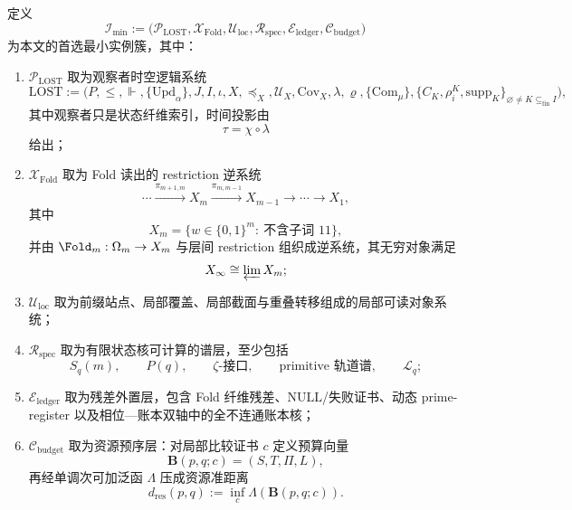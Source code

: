 \begin{definition}[首选最小实例簇]\label{def:typed-address-biaxial-completion-preferred-minimal-instantiation}
定义
\[
\mathcal I_{\min}
:=
\bigl(
\mathcal P_{\mathrm{LOST}},
\mathcal X_{\mathrm{Fold}},
\mathcal U_{\mathrm{loc}},
\mathcal R_{\mathrm{spec}},
\mathcal E_{\mathrm{ledger}},
\mathcal C_{\mathrm{budget}}
\bigr)
\]
为本文的首选最小实例簇，其中：
\begin{enumerate}
  \item \(\mathcal P_{\mathrm{LOST}}\) 取为观察者时空逻辑系统
  \[
  \mathrm{LOST}
  :=
  \bigl(
  P,\le,\Vdash,\{\mathrm{Upd}_\alpha\},J,I,\iota,
  X,\preceq_X,\mathcal U_X,\mathrm{Cov}_X,\lambda,\varrho,\{\mathrm{Com}_\mu\},
  \{C_K,\rho_i^K,\mathrm{supp}_K\}_{\varnothing\neq K\subseteq_{\mathrm{fin}} I}
  \bigr),
  \]
  其中观察者只是状态纤维索引，时间投影由
  \[
  \tau=\chi\circ\lambda
  \]
  给出；
  \item \(\mathcal X_{\mathrm{Fold}}\) 取为 Fold 读出的 restriction 逆系统
  \[
  \cdots \xrightarrow{\pi_{m+1,m}} X_m \xrightarrow{\pi_{m,m-1}} X_{m-1}\xrightarrow{}\cdots\xrightarrow{}X_1,
  \]
  其中
  \[
  X_m=\{w\in\{0,1\}^m:\ \text{不含子词 }11\},
  \]
  并由 \(\Fold_m:\Omega_m\to X_m\) 与层间 restriction 组织成逆系统，其无穷对象满足
  \[
  X_\infty\cong \varprojlim X_m;
  \]
  \item \(\mathcal U_{\mathrm{loc}}\) 取为前缀站点、局部覆盖、局部截面与重叠转移组成的局部可读对象系统；
  \item \(\mathcal R_{\mathrm{spec}}\) 取为有限状态核可计算的谱层，至少包括
  \[
  S_q(m),\qquad
  P(q),\qquad
  \zeta\text{-接口},\qquad
  \text{primitive 轨道谱},\qquad
  \mathcal L_q;
  \]
  \item \(\mathcal E_{\mathrm{ledger}}\) 取为残差外置层，包含 Fold 纤维残差、\(\mathrm{NULL}\)/失败证书、动态 prime-register 以及相位—账本双轴中的全不连通账本核；
  \item \(\mathcal C_{\mathrm{budget}}\) 取为资源预序层：对局部比较证书 \(c\) 定义预算向量
  \[
  \mathbf B(p,q;c)=(S,T,\Pi,L),
  \]
  再经单调次可加泛函 \(\Lambda\) 压成资源准距离
  \[
  d_{\mathrm{res}}(p,q):=\inf_c \Lambda(\mathbf B(p,q;c)).
  \]
\end{enumerate}
\end{definition}

